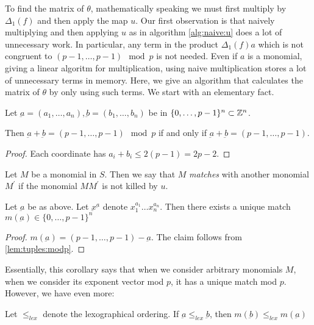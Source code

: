 
To find the matrix of \(\theta\), mathematically
speaking we must first multiply by \(\Delta_{1}(f)\) 
and then apply the map \(u\).
Our first observation is that naively 
multiplying and then applying \(u\) 
as in algorithm \ref{alg:naive:u}
does a lot of unnecessary work.
In particular, any term in the 
product \(\Delta_{1}(f)a\) which 
is not congruent to 
\((p-1, \ldots, p-1) \mod p\)
is not needed. 
Even if \(a\) is a monomial, giving a linear
algoritm for multiplication, using naive
multiplication stores a lot of unnecessary terms
in memory.
Here, we give an algorithm that calculates
the matrix of \(\theta\) by only
using such terms.
We start with an elementary fact.

\begin{lem}
	\label{lem:tuples:modp}
	Let \(\underbar{a} = (a_{1}, \ldots, a_{n}),
	\underbar{b} = (b_{1}, \ldots, b_{n})\)
	be in \(\{0, \ldots, p-1\}^{n} \subset \mathbb{Z}^{n}\).

	Then \(\underbar{a} + \underbar{b} = 
	(p-1, \ldots, p-1) \mod p\)
	if and only if 
	\(\underbar{a} + \underbar{b} = 
	(p-1, \ldots, p-1)\).
\end{lem}

\begin{proof}
	Each coordinate has \(a_{i} + b_{i} \leq 2(p-1) = 2p-2\).
\end{proof}

\begin{defn}
	Let \(M\) be a monomial in \(S\). 
	Then we say that \(M\) \textit{matches}
	with another monomial \(M^{\prime}\) 
	if the monomial \(MM^{\prime}\) is
	not killed by \(u\).
\end{defn}

\begin{cor}
	Let \(\underbar{a}\) be as above.
	Let \(\underbar{x}^{\underbar{a}}\)
	denote \(x_{1}^{a_{1}} \ldots x_{n}^{a_{n}}\).
	Then there exists a unique
	match \(m(\underbar{a}) \in \{0, \ldots, p-1\}^{n}\) 
\end{cor}

\begin{proof}
	\(m(\underbar{a}) = 
	(p-1, \ldots, p-1) - \underbar{a}\).
	The claim follows from 
	\ref{lem:tuples:modp}.
\end{proof}

Essentially, this corollary says that
when we consider arbitrary monomials \(M\),
when we consider its exponent vector 
mod \(p\), it has a unique
match mod \(p\).
However, we have even more:

\begin{cor}
	\label{cor:match:order}
	Let \(\leq_{lex}\) denote the 
	lexographical ordering.
	If \(\underbar{a} \leq_{lex} \underbar{b}\),
	then 
	\(m(\underbar{b}) \leq_{lex} m(\underbar{a})\)
\end{cor}

